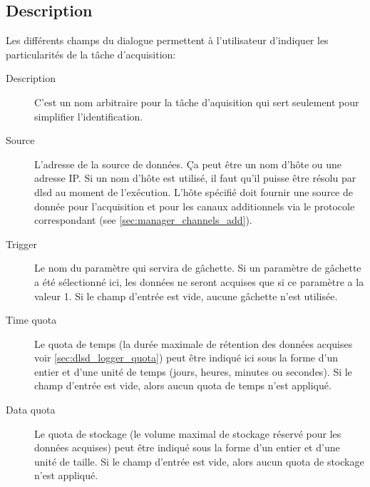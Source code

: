 \documentclass[a4paper,12pt,BCOR6mm,bibtotoc,idxtotoc]{scrbook}
\begin{document}

\subsection{Description}

Les diff\'erents champs du dialogue permettent \`a l'utilisateur
d'indiquer les particularit\'es de la t\^ache d'acquisition:

\begin{description}

\item[Description]
  C'est un nom arbitraire pour la t\^ache d'aquisition qui sert seulement
pour simplifier l'identification.

\item[Source]
  L'adresse de la source de donn\'ees. \c Ca peut \^etre un nom
  d'h\^ote ou une adresse IP. Si un nom d'h\^ote est utilis\'e, il
  faut qu'il puisse \^etre r\'esolu par dlsd au moment de
  l'ex\'ecution.  L'h\^ote sp\'ecifi\'e doit fournir une source de
  donn\'ee pour l'acquisition et pour les canaux additionnels via le
  protocole correspondant (see \autoref{sec:manager_channels_add}).

\item[Trigger]
  Le nom du param\`etre qui servira de g\^achette.
  Si un param\`etre de g\^achette a \'et\'e s\'electionn\'e ici,
  les donn\'ees ne seront acquises que si ce param\`etre a la valeur 1.
  Si le champ d'entr\'ee est vide, aucune g\^achette n'est utilis\'ee.

\item[Time quota]
  Le quota de temps (la dur\'ee maximale de r\'etention des donn\'ees
  acquises voir \autoref{sec:dlsd_logger_quota}) peut \^etre
  indiqu\'e ici sous la forme d'un entier et d'une unit\'e de temps
  (jours, heures, minutes ou secondes).  Si le champ d'entr\'ee est
  vide, alors aucun quota de temps n'est appliqu\'e.

\item[Data quota]
  Le quota de stockage (le volume maximal de stockage r\'eserv\'e pour
  les donn\'ees acquises) peut \^etre indiqu\'e sous la forme d'un
  entier et d'une unit\'e de taille.  Si le champ d'entr\'ee est
  vide, alors aucun quota de stockage n'est appliqu\'e.

\end{description}

\end{document}
